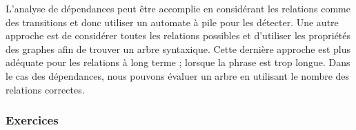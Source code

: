 \documentclass{KodeBook}
\begin{document}
L'analyse de dépendances peut être accomplie en considérant les relations comme des transitions et donc utiliser un automate à pile pour les détecter.
Une autre approche est de considérer toutes les relations possibles et d'utiliser les propriétés des graphes afin de trouver un arbre syntaxique. 
Cette dernière approche est plus adéquate pour les relations à long terme ; lorsque la phrase est trop longue.
Dans le cas des dépendances, nous pouvons évaluer un arbre en utilisant le nombre des relations correctes.



\subsubsection*{Exercices}
\end{document}
